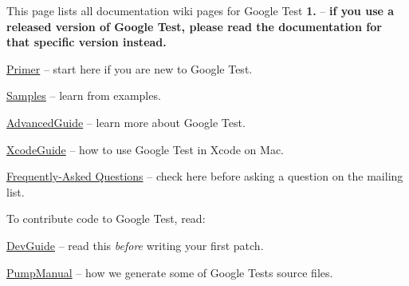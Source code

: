 This page lists all documentation wiki pages for Google Test {\bfseries 1.} -- {\bfseries if you use a released version of Google Test, please read the documentation for that specific version instead.}


\begin{DoxyItemize}
\item \hyperlink{_v1__6___primer_8md}{Primer} -- start here if you are new to Google Test.
\item \hyperlink{_v1__6___samples_8md}{Samples} -- learn from examples.
\item \hyperlink{_v1__6___advanced_guide_8md}{Advanced\+Guide} -- learn more about Google Test.
\item \hyperlink{_v1__6___xcode_guide_8md}{Xcode\+Guide} -- how to use Google Test in Xcode on Mac.
\item \hyperlink{_v1__6___f_a_q_8md}{Frequently-\/\+Asked Questions} -- check here before asking a question on the mailing list.
\end{DoxyItemize}

To contribute code to Google Test, read\+:


\begin{DoxyItemize}
\item \hyperlink{googletest_2docs_2_dev_guide_8md}{Dev\+Guide} -- read this {\itshape before} writing your first patch.
\item \hyperlink{_v1__6___pump_manual_8md}{Pump\+Manual} -- how we generate some of Google Test\textquotesingle{}s source files. 
\end{DoxyItemize}
